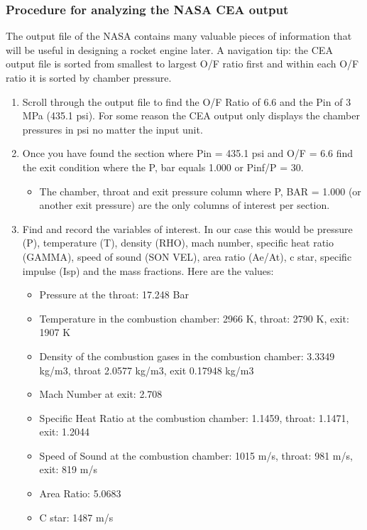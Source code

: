 \documentclass[12pt, letter paper]{article}
\begin{document}
			\subsubsection{Procedure for analyzing the NASA CEA output}
				The output file of the NASA contains many valuable pieces of information that will be useful in designing a rocket engine later. 
				A navigation tip: the CEA output file is sorted from smallest to largest O/F ratio first and within each O/F ratio it is sorted by chamber pressure. 
				\begin{enumerate}
					\item Scroll through the output file to find the O/F Ratio of 6.6 and the Pin of 3 MPa (435.1 psi). For some reason the CEA output only displays the chamber pressures in psi no matter the input unit.
					\item Once you have found the section where Pin = 435.1 psi and O/F = 6.6 find the exit condition where the P, bar equals 1.000 or Pinf/P = 30. 
						\begin{itemize}
							\item The chamber, throat and exit pressure column where P, BAR = 1.000 (or another exit pressure) are the only columns of interest per section.
						\end{itemize}
					\item Find and record the variables of interest.
						In our case this would be pressure (P), temperature (T), density (RHO), mach number, specific heat ratio (GAMMA), speed of sound (SON VEL), area ratio (Ae/At),
						c star, specific impulse (Isp) and the mass fractions. Here are the values:
						\begin{itemize}
							\item Pressure at the throat: 17.248 Bar
							\item Temperature in the combustion chamber: 2966 K, throat: 2790 K, exit: 1907 K
							\item Density of the combustion gases in the combustion chamber: 3.3349 kg/m3, throat 2.0577 kg/m3, exit 0.17948 kg/m3
							\item Mach Number at exit: 2.708
							\item Specific Heat Ratio at the combustion chamber: 1.1459, throat: 1.1471, exit: 1.2044
							\item Speed of Sound at the combustion chamber: 1015 m/s, throat: 981 m/s, exit: 819 m/s
							\item Area Ratio: 5.0683
							\item C star: 1487 m/s

\end{itemize}
\end{enumerate}
\end{document}
